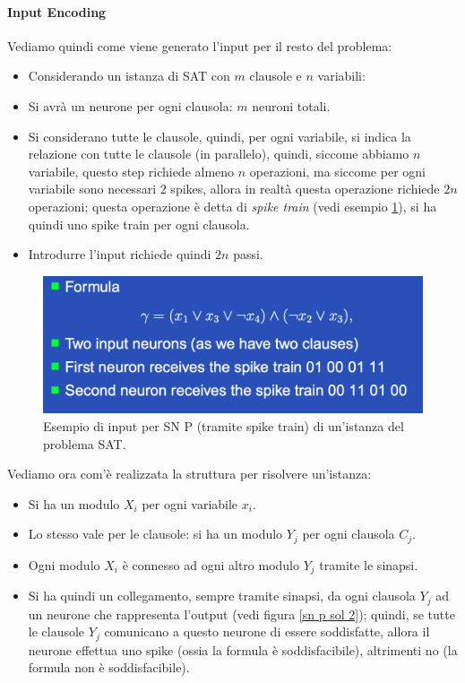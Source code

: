 \documentclass[12pt,a4paper]{report}
\begin{document}
\paragraph{Input Encoding}
Vediamo quindi come viene generato l'input per il resto del problema:
\begin{itemize}
\item Considerando un istanza di SAT con $m$ clausole e $n$ variabili:
\item Si avrà un neurone per ogni clausola: $m$ neuroni totali.
\item Si considerano tutte le clausole, quindi, per ogni variabile, si indica la relazione con tutte le clausole (in parallelo), quindi, siccome abbiamo $n$ variabile, questo step richiede almeno $n$ operazioni, ma siccome per ogni variabile sono necessari 2 spikes, allora in realtà questa operazione richiede $2n$ operazioni; questa operazione è detta di \textit{spike train} (vedi esempio \ref{sn p sol 1}), si ha quindi uno spike train per ogni clausola.
\item Introdurre l'input richiede quindi $2n$ passi.
\end{itemize}
\begin{figure}[h]
	\centering
	\includegraphics[width=0.8\linewidth]{img/sn p sol 1}
	\caption{Esempio di input per SN P (tramite spike train) di un'istanza del problema SAT.}
	\label{sn p sol 1}
\end{figure}
Vediamo ora com'è realizzata la struttura per risolvere un'istanza:
\begin{itemize}
\item Si ha un modulo $X_{i}$ per ogni variabile $x_{i}$.
\item Lo stesso vale per le clausole: si ha un modulo $Y_{j}$ per ogni clausola $C_{j}$.
\item Ogni modulo $X_{i}$ è connesso ad ogni altro modulo $Y_{j}$ tramite le sinapsi.
\item Si ha quindi un collegamento, sempre tramite sinapsi, da ogni clausola $Y_{j}$ ad un neurone che rappresenta l'output (vedi figura \ref{sn p sol 2}); quindi, se tutte le clausole $Y_{j}$ comunicano a questo neurone di essere soddisfatte, allora il neurone effettua uno spike (ossia la formula è soddisfacibile), altrimenti no (la formula non è soddisfacibile).
\end{itemize}
\end{document}
